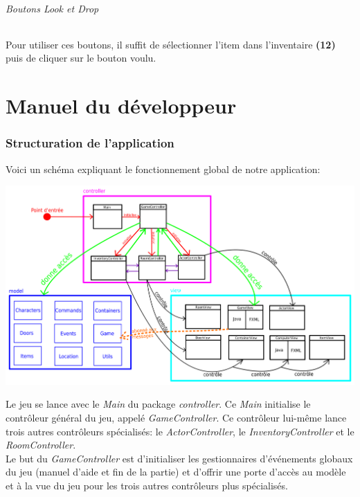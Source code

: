 \documentclass[./standalone.tex]{subfiles}
\begin{document}
\paragraph{Boutons Look et Drop\\}
    Pour utiliser ces boutons, il suffit de sélectionner l’item dans l’inventaire \textbf{(12)} puis de cliquer sur le bouton voulu.

\newpage
\part{Manuel du développeur}


\section{Structuration de l'application}

Voici un schéma expliquant le fonctionnement global de notre application:

\begin{center}
	\includegraphics[scale=0.31]{images/structuration.png}
\end{center}

Le jeu se lance avec le \textit{Main} du package \textit{controller}. Ce \textit{Main} initialise le contrôleur général du jeu, appelé \textit{GameController}. Ce contrôleur lui-même lance trois autres contrôleurs spécialisés: le \textit{ActorController}, le \textit{InventoryController} et le \textit{RoomController}.\\

Le but du \textit{GameController} est d'initialiser les gestionnaires d'événements globaux du jeu (manuel d'aide et fin de la partie) et d'offrir une porte d'accès au modèle et à la vue du jeu pour les trois autres contrôleurs plus spécialisés.\\
\end{document}
